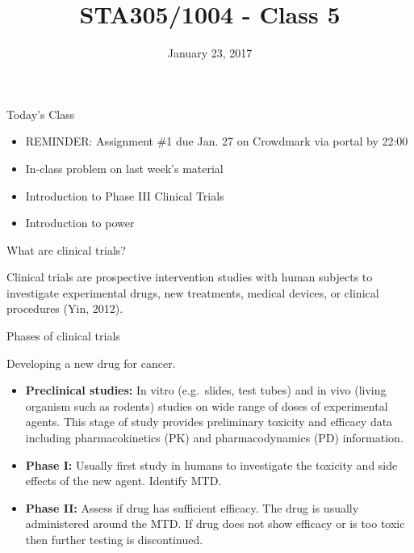 \documentclass[ignorenonframetext,]{beamer}
\title{STA305/1004 - Class 5}
\date{January 23, 2017}
\providecommand{\tightlist}{%
\setlength{\itemsep}{0pt}\setlength{\parskip}{0pt}}
\begin{document}
\frame{\titlepage}

\begin{frame}{Today's Class}

\begin{itemize}
\tightlist
\item
  REMINDER: Assignment \#1 due Jan. 27 on Crowdmark via portal by 22:00
\item
  In-class problem on last week's material
\item
  Introduction to Phase III Clinical Trials
\item
  Introduction to power
\end{itemize}

\end{frame}

\begin{frame}{What are clinical trials?}

Clinical trials are prospective intervention studies with human subjects
to investigate experimental drugs, new treatments, medical devices, or
clinical procedures (Yin, 2012).

\end{frame}

\begin{frame}{Phases of clinical trials}

Developing a new drug for cancer.

\begin{itemize}
\item
  \textbf{Preclinical studies:} In vitro (e.g.~slides, test tubes) and
  in vivo (living organism such as rodents) studies on wide range of
  doses of experimental agents. This stage of study provides preliminary
  toxicity and efficacy data including pharmacokinetics (PK) and
  pharmacodynamics (PD) information.
\item
  \textbf{Phase I:} Usually first study in humans to investigate the
  toxicity and side effects of the new agent. Identify MTD.
\item
  \textbf{Phase II:} Assess if drug has sufficient efficacy. The drug is
  usually administered around the MTD. If drug does not show efficacy or
  is too toxic then further testing is discontinued.
\end{itemize}

\end{frame}
\end{document}
